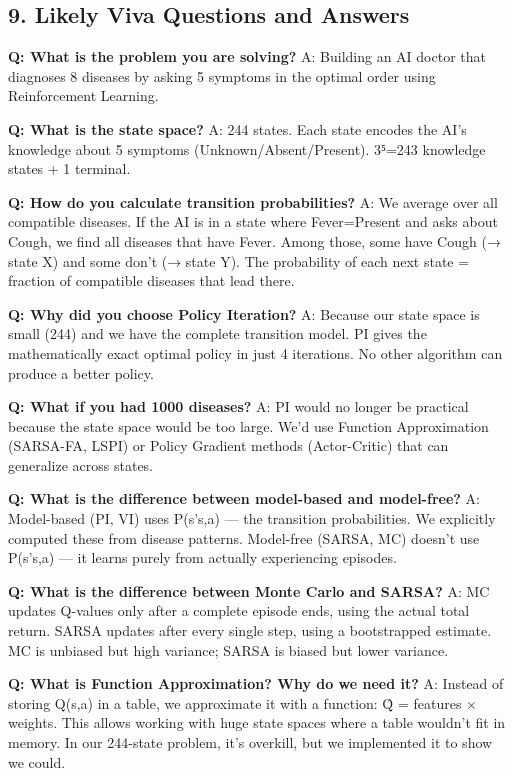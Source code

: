 \documentclass[
]{article}
\begin{document}
\hypertarget{likely-viva-questions-and-answers}{%
\subsection{9. Likely Viva Questions and
Answers}\label{likely-viva-questions-and-answers}}

\textbf{Q: What is the problem you are solving?} A: Building an AI
doctor that diagnoses 8 diseases by asking 5 symptoms in the optimal
order using Reinforcement Learning.

\textbf{Q: What is the state space?} A: 244 states. Each state encodes
the AI's knowledge about 5 symptoms (Unknown/Absent/Present). 3⁵=243
knowledge states + 1 terminal.

\textbf{Q: How do you calculate transition probabilities?} A: We average
over all compatible diseases. If the AI is in a state where
Fever=Present and asks about Cough, we find all diseases that have
Fever. Among those, some have Cough (→ state X) and some don't (→ state
Y). The probability of each next state = fraction of compatible diseases
that lead there.

\textbf{Q: Why did you choose Policy Iteration?} A: Because our state
space is small (244) and we have the complete transition model. PI gives
the mathematically exact optimal policy in just 4 iterations. No other
algorithm can produce a better policy.

\textbf{Q: What if you had 1000 diseases?} A: PI would no longer be
practical because the state space would be too large. We'd use Function
Approximation (SARSA-FA, LSPI) or Policy Gradient methods (Actor-Critic)
that can generalize across states.

\textbf{Q: What is the difference between model-based and model-free?}
A: Model-based (PI, VI) uses P(s'\textbar s,a) --- the transition
probabilities. We explicitly computed these from disease patterns.
Model-free (SARSA, MC) doesn't use P(s'\textbar s,a) --- it learns
purely from actually experiencing episodes.

\textbf{Q: What is the difference between Monte Carlo and SARSA?} A: MC
updates Q-values only after a complete episode ends, using the actual
total return. SARSA updates after every single step, using a
bootstrapped estimate. MC is unbiased but high variance; SARSA is biased
but lower variance.

\textbf{Q: What is Function Approximation? Why do we need it?} A:
Instead of storing Q(s,a) in a table, we approximate it with a function:
Q̂ = features × weights. This allows working with huge state spaces where
a table wouldn't fit in memory. In our 244-state problem, it's overkill,
but we implemented it to show we could.
\end{document}
